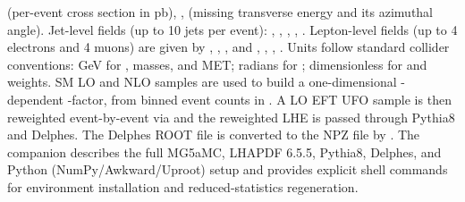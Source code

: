\markdownRendererUlItem {} (per-event cross section in pb),\markdownRendererUlItemEnd 
\markdownRendererUlItem {},  (missing transverse energy and its azimuthal angle).\markdownRendererUlItemEnd 
\markdownRendererUlEndTight \markdownRendererInterblockSeparator
{}Jet-level fields (up to 10 jets per event): , , , , . Lepton-level fields (up to 4 electrons and 4 muons) are given by , , ,  and , , , . Units follow standard collider conventions: GeV for , masses, and MET; radians for \markdownRendererInlineMath{\phi}; dimensionless for \markdownRendererInlineMath{\eta} and weights.\markdownRendererInterblockSeparator
{}
\markdownRendererSectionEnd \markdownRendererSectionBegin
{}\markdownRendererInterblockSeparator
{}SM LO and NLO  samples are used to build a one-dimensional -dependent -factor,\markdownRendererParagraphSeparator
{}\markdownRendererParagraphSeparator
{}from binned event counts in . A LO EFT UFO sample is then reweighted event-by-event via\markdownRendererParagraphSeparator
{}\markdownRendererParagraphSeparator
{}and the reweighted LHE is passed through Pythia8 and Delphes. The Delphes ROOT file is converted to the NPZ file by . The companion  describes the full MG5\markdownRendererUnderscore{}aMC, LHAPDF 6.5.5, Pythia8, Delphes, and Python (NumPy/Awkward/Uproot) setup and provides explicit shell commands for environment installation and reduced-statistics regeneration.\markdownRendererParagraphSeparator
